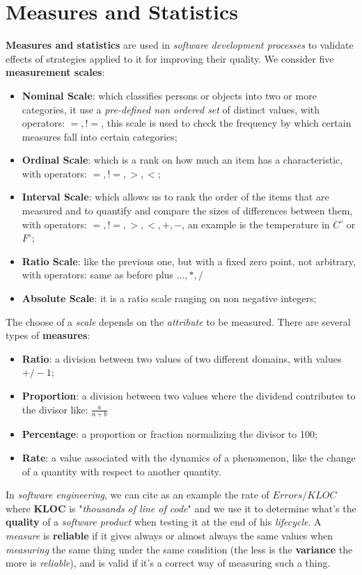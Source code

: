 \documentclass{article}
\begin{document}
\section{Measures and Statistics}
\textbf{Measures and statistics} are used in \emph{software development processes} to validate effects of strategies applied to it for improving their quality. We consider five \textbf{measurement scales}:
\begin{itemize}
\item \textbf{Nominal Scale}: which classifies persons or objects into two or more categories, it use a \emph{pre-defined non ordered set} of distinct values, with operators: $=, !=$, this scale is used to check the frequency by which certain measures fall into certain categories;
\item \textbf{Ordinal Scale}: which is a rank on how much an item has a characteristic, with operators: $=, !=, >, <$;
\item \textbf{Interval Scale}: which allows us to rank the order of the items that are measured and to quantify and compare the sizes of differences between them, with operators: $=, !=, >, <, +, -$, an example is the temperature in $C^{\circ}$ or $F^{\circ}$;
\item \textbf{Ratio Scale}: like the previous one, but with a fixed zero point, not arbitrary, with operators: same as before plus $... , *, /$
\item \textbf{Absolute Scale}: it is a ratio scale ranging on non negative integers;
\end{itemize}
The choose of a \emph{scale} depends on the \emph{attribute} to be measured. There are several types of \textbf{measures}:
\begin{itemize}
\item \textbf{Ratio}: a division between two values of two different domains, with values $+/- 1$;
\item \textbf{Proportion}: a division between two values where the dividend contributes to the divisor like: $\frac{a}{a+b}$
\item \textbf{Percentage}: a proportion or fraction normalizing the divisor to 100;
\item \textbf{Rate}: a value associated with the dynamics of a phenomenon, like the change of a quantity with respect to another quantity.
\end{itemize}
In \emph{software engineering}, we can cite as an example the rate of $Errors/KLOC$ where \textbf{KLOC} is "\emph{thousands of line of code}" and we use it to determine what's the \textbf{quality} of a \emph{software product} when testing it at the end of his \emph{lifecycle}. A \emph{measure} is \textbf{reliable} if it gives always or almost always the same values when \emph{measuring} the same thing under the same condition (the less is the \textbf{variance} the more is \emph{reliable}), and is valid if it's a correct way of measuring such a thing. 
\end{document}
